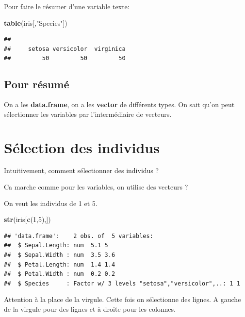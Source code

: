 \documentclass[
]{book}
\newenvironment{Shaded}{\begin{snugshade}}{\end{snugshade}}
\newcommand{\DecValTok}[1]{\textcolor[rgb]{0.00,0.00,0.81}{#1}}
\newcommand{\FunctionTok}[1]{\textcolor[rgb]{0.13,0.29,0.53}{\textbf{#1}}}
\newcommand{\NormalTok}[1]{#1}
\newcommand{\StringTok}[1]{\textcolor[rgb]{0.31,0.60,0.02}{#1}}
\begin{document}
Pour faire le résumer d'une variable texte:

\begin{Shaded}
\begin{Highlighting}[]
\FunctionTok{table}\NormalTok{(iris[,}\StringTok{"Species"}\NormalTok{])}
\end{Highlighting}
\end{Shaded}

\begin{verbatim}
## 
##     setosa versicolor  virginica 
##         50         50         50
\end{verbatim}

\subsection{Pour résumé}\label{pour-ruxe9sumuxe9}

On a les \textbf{data.frame}, on a les \textbf{vector} de différents types. On sait qu'on
peut sélectionner les variables par l'intermédiaire de vecteurs.

\section{Sélection des individus}\label{suxe9lection-des-individus}

Intuitivement, comment sélectionner des individus ?

Ca marche comme pour les variables, on utilise des vecteurs ?

On veut les individus de 1 et 5.

\begin{Shaded}
\begin{Highlighting}[]
\FunctionTok{str}\NormalTok{(iris[}\FunctionTok{c}\NormalTok{(}\DecValTok{1}\NormalTok{,}\DecValTok{5}\NormalTok{),])}
\end{Highlighting}
\end{Shaded}

\begin{verbatim}
## 'data.frame':    2 obs. of  5 variables:
##  $ Sepal.Length: num  5.1 5
##  $ Sepal.Width : num  3.5 3.6
##  $ Petal.Length: num  1.4 1.4
##  $ Petal.Width : num  0.2 0.2
##  $ Species     : Factor w/ 3 levels "setosa","versicolor",..: 1 1
\end{verbatim}

Attention à la place de la virgule. Cette fois on sélectionne des lignes. A gauche
de la virgule pour des lignes et à droite pour les colonnes.
\end{document}
